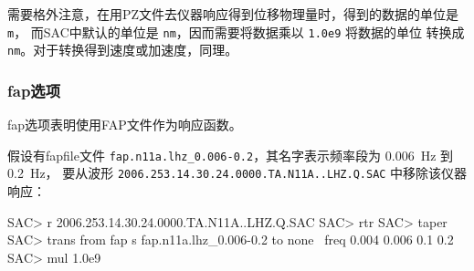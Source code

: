 需要格外注意，在用PZ文件去仪器响应得到位移物理量时，得到的数据的单位是 \texttt{m}，
而SAC中默认的单位是 \texttt{nm}，因而需要将数据乘以 \texttt{1.0e9} 将数据的单位
转换成 \texttt{nm}。对于转换得到速度或加速度，同理。

\subsubsection{fap选项}
fap选项表明使用FAP文件作为响应函数。

假设有fapfile文件 \verb|fap.n11a.lhz_0.006-0.2|，其名字表示频率段为
\SI{0.006}{\Hz} 到 \SI{0.2}{\Hz}，
要从波形 \texttt{2006.253.14.30.24.0000.TA.N11A..LHZ.Q.SAC} 中移除该仪器响应：
\begin{SACCode}
SAC> r 2006.253.14.30.24.0000.TA.N11A..LHZ.Q.SAC
SAC> rtr
SAC> taper
SAC> trans from fap s fap.n11a.lhz_0.006-0.2 to none \
                        freq 0.004 0.006 0.1 0.2
SAC> mul 1.0e9
\end{SACCode}
